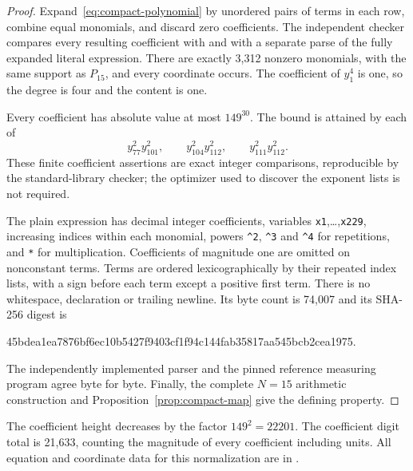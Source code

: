 \documentclass[11pt,a4paper]{article}
\begin{document}
\begin{proof}
Expand~\eqref{eq:compact-polynomial} by unordered pairs of terms in
each row, combine equal monomials, and discard zero coefficients.
The independent checker compares every resulting coefficient with
 and with a separate parse of the fully
expanded literal expression. There are exactly 3,312 nonzero
monomials, with the same support as $P_{15}$, and every coordinate
occurs. The coefficient of $y_1^4$ is one, so the degree is four
and the content is one.

Every coefficient has absolute value at most $149^{30}$.
The bound is attained by each of
\[
 y_{77}^2y_{101}^2,\qquad
 y_{104}^2y_{112}^2,\qquad
 y_{111}^2y_{112}^2.
\]
These finite coefficient assertions are exact integer comparisons,
reproducible by the standard-library checker; the optimizer used
to discover the exponent lists is not required.

The plain expression has decimal integer coefficients, variables
\texttt{x1},\ldots,\texttt{x229}, increasing indices within each
monomial, powers \texttt{\textasciicircum{}2}, \texttt{\textasciicircum{}3} and \texttt{\textasciicircum{}4} for
repetitions, and \texttt{*} for multiplication. Coefficients of
magnitude one are omitted on nonconstant terms. Terms are ordered
lexicographically by their repeated index lists, with a sign before
each term except a positive first term. There is no whitespace,
declaration or trailing newline. Its byte count is 74,007 and its
SHA-256 digest is
\begin{center}\small\ttfamily
45bdea1ea7876bf6ec10b5427f9403cf1f94c144fab35817aa545bcb2cea1975.
\end{center}
The independently implemented parser and the pinned reference
measuring program agree byte for byte. Finally, the complete
$N=15$ arithmetic construction and Proposition~\ref{prop:compact-map}
give the defining property.
\end{proof}

The coefficient height decreases by the factor $149^2=22201$.
The coefficient digit total is 21,633, counting the magnitude of
every coefficient including units. All equation and coordinate
data for this normalization are in
.
\end{document}
